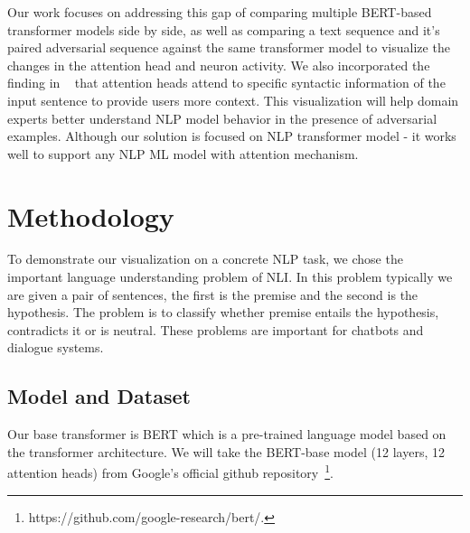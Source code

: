 \documentclass[journal]{vgtc}                %
\begin{document}

Our work focuses on addressing this gap of comparing multiple BERT-based transformer models side by side, as well as comparing a text sequence and it's paired adversarial sequence against the same transformer model to visualize the changes in the attention head and neuron activity. We also incorporated the finding in ~\cite{clark2019does} that attention heads attend to specific syntactic information of the input sentence to provide users more context. This visualization will help domain experts better understand NLP model behavior in the presence of adversarial examples. Although our solution is focused on NLP transformer model - it works well to support any NLP ML model with attention mechanism. 

\section{Methodology}

To demonstrate our visualization on a concrete NLP task, we chose the important language understanding problem of NLI. In this problem typically we are given a pair of sentences, the first is the premise and the second is the hypothesis. The problem is to classify whether premise entails the hypothesis, contradicts it or is neutral. These problems are important for chatbots and dialogue systems.

\subsection{Model and Dataset}

Our base transformer is BERT which is a pre-trained language model based on the transformer architecture. We will take the BERT-base model (12 layers, 12 attention heads) from Google's official github repository~\footnote{https://github.com/google-research/bert/.}. 
\end{document}
